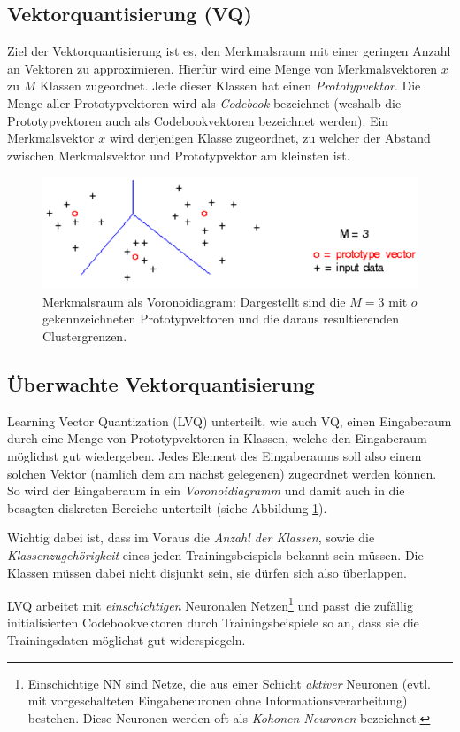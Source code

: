 \subsection*{Vektorquantisierung (VQ)}
Ziel der Vektorquantisierung ist es, den Merkmalsraum mit einer geringen Anzahl an Vektoren zu approximieren.
Hierfür wird eine Menge von Merkmalsvektoren $x$ zu $M$ Klassen zugeordnet. Jede dieser Klassen hat einen \emph{Prototypvektor}. Die Menge aller Prototypvektoren wird als \emph{Codebook} bezeichnet (weshalb die Prototypvektoren auch als Codebookvektoren bezeichnet werden).
Ein Merkmalsvektor $x$ wird derjenigen Klasse zugeordnet, zu welcher der Abstand zwischen Merkmalsvektor und Prototypvektor am kleinsten ist.

\begin{figure}[ht!] \centering 
	\includegraphics[width=\linewidth]{figures/ch07_vq.pdf}
	\caption{Merkmalsraum als Voronoidiagram: Dargestellt sind die $M=3$ mit $o$ gekennzeichneten Prototypvektoren und die daraus resultierenden Clustergrenzen.}
	\label{fig:ch07_vq}
\end{figure}

\subsection*{Überwachte Vektorquantisierung}
Learning Vector Quantization (LVQ) unterteilt, wie auch VQ, einen Eingaberaum durch eine Menge von Prototypvektoren in Klassen, welche den Eingaberaum möglichst gut wiedergeben. Jedes Element des Eingaberaums soll also einem solchen Vektor (nämlich dem am nächst gelegenen) zugeordnet werden können.
So wird der Eingaberaum in ein \emph{Voronoidiagramm} und damit auch in die besagten diskreten Bereiche unterteilt (siehe Abbildung \ref{fig:ch07_vq}).

Wichtig dabei ist, dass im Voraus die \emph{Anzahl der Klassen}, sowie die \emph{Klassenzugehörigkeit} eines jeden Trainingsbeispiels bekannt sein müssen. Die Klassen müssen dabei nicht disjunkt sein, sie dürfen sich also überlappen.

LVQ arbeitet mit \emph{einschichtigen} Neuronalen Netzen\footnote{Einschichtige NN sind Netze, die aus einer Schicht \emph{aktiver} Neuronen (evtl. mit vorgeschalteten Eingabeneuronen ohne Informationsverarbeitung) bestehen. Diese Neuronen werden oft als \emph{Kohonen-Neuronen} bezeichnet.} und passt die zufällig initialisierten Codebookvektoren durch Trainingsbeispiele so an, dass sie die Trainingsdaten möglichst gut widerspiegeln.




